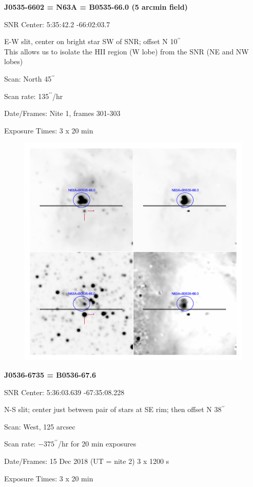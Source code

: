 \documentclass[11pt]{article}
\newcommand{\arcsec}{$^{\prime\prime}$}
\begin{document}
\newpage
{\bf J0535-6602 = N63A = B0535-66.0   (5  arcmin field)}  
 
SNR Center:   5:35:42.2   -66:02:03.7   

E-W slit, center on bright star SW of SNR; offset N 10\arcsec \\
This allows us to isolate the HII region (W lobe) from the SNR (NE and NW lobes)

Scan:  North 45\arcsec

Scan rate:  135\arcsec/hr

Date/Frames:   Nite 1, frames 301-303

Exposure Times:  3 x 20 min

\begin{figure}
\includegraphics[width=12.5cm]{snapshots/N63A_5arcmin.png}
\end{figure}

\newpage
{\bf J0536-6735 = B0536-67.6}  
 
SNR Center:   5:36:03.639     -67:35:08.228

N-S slit; center just between pair of stars at SE rim; then offset N 38\arcsec

Scan:  West, 125 arcsec

Scan rate: $ -375^{\prime\prime}$/hr for 20 min exposures

Date/Frames:  15 Dec 2018 (UT = nite 2)  3 x 1200 s

Exposure Times:   3 x 20 min
\end{document}
